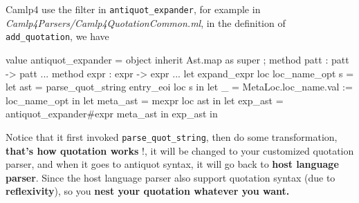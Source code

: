 Camlp4 use the filter in \verb|antiquot_expander|, for example in
\textit{Camlp4Parsers/Camlp4QuotationCommon.ml}, in the definition of
\verb|add_quotation|, we have


\begin{bluecode}
value antiquot_expander = object
  inherit Ast.map as super ;
  method patt : patt -> patt ...
  method expr : expr -> expr ...
let expand_expr loc loc_name_opt s =
  let ast = parse_quot_string entry_eoi loc s in
  let _ = MetaLoc.loc_name.val := loc_name_opt in
  let meta_ast = mexpr loc ast in
  let exp_ast = antiquot_expander#expr meta_ast in
  exp_ast in
\end{bluecode}


Notice that it first invoked \verb|parse_quot_string|, then do some
transformation, \textbf{ that's how quotation works} !, it will be
changed to your customized quotation parser, and when it goes to
antiquot syntax, it will go back to \textbf{ host language
  parser}. Since the host language parser also support quotation
syntax (due to \textbf{ reflexivity}), so you \textbf{ nest your
  quotation whatever you want.}

